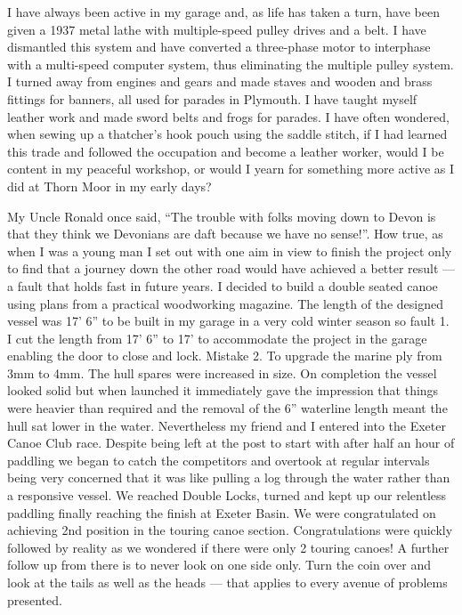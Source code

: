 
I have always been active in my garage and, as life has taken a turn, have been
given a 1937 metal lathe with multiple-speed pulley drives and a belt. I have
dismantled this system and have converted a three-phase motor to interphase
with a multi-speed computer system, thus eliminating the multiple pulley
system. I turned away from engines and gears and made staves and wooden and
brass fittings for banners, all used for parades in Plymouth. I have taught
myself leather work and made sword belts and frogs for parades. I have often
wondered, when sewing up a thatcher's hook pouch using the saddle stitch, if I
had learned this trade and followed the occupation and become a leather worker,
would I be content in my peaceful workshop, or would I yearn for something more
active as I did at Thorn Moor in my early days?

My Uncle Ronald once said, ``The trouble with folks moving down to Devon is that
they think we Devonians are daft because we have no sense!''. How true, as when
I was a young man I set out with one aim in view to finish the project only to
find that a journey down the other road would have achieved a better result ---
a fault that holds fast in future years. I decided to build a double seated
canoe using plans from a practical woodworking magazine. The length of the
designed vessel was 17' 6'' to be built in my garage in a very cold winter
season so fault 1. I cut the length from 17' 6'' to 17' to accommodate the
project in the garage enabling the door to close and lock. Mistake 2. To
upgrade the marine ply from 3mm to 4mm. The hull spares were increased in size.
On completion the vessel looked solid but when launched it immediately gave the
impression that things were heavier than required and the removal of the 6''
waterline length meant the hull sat lower in the water. Nevertheless my friend
and I entered into the Exeter Canoe Club race. Despite being left at the post
to start with after half an hour of paddling we began to catch the competitors
and overtook at regular intervals being very concerned that it was like pulling
a log through the water rather than a responsive vessel. We reached Double
Locks, turned and kept up our relentless paddling finally reaching the finish
at Exeter Basin. We were congratulated on achieving 2nd position in the touring
canoe section. Congratulations were quickly followed by reality as we wondered
if there were only 2 touring canoes! A further follow up from there is to never
look on one side only. Turn the coin over and look at the tails as well as the
heads --- that applies to every avenue of problems presented.

